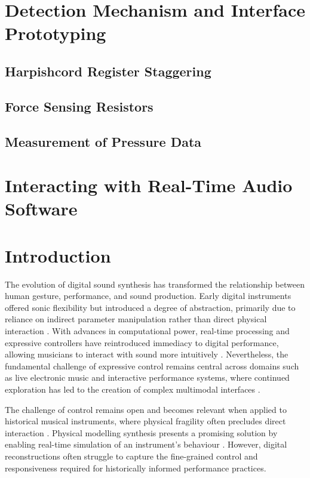 \section{Detection Mechanism and Interface Prototyping}
\subsection{Harpishcord Register Staggering}
\subsection{Force Sensing Resistors}
\subsection{Measurement of Pressure Data}
\section{Interacting with Real-Time Audio Software}


\section{Introduction} 
\label{sec:introduction}
The evolution of digital sound synthesis has transformed the relationship between human gesture, performance, and sound production. Early digital instruments offered sonic flexibility but introduced a degree of abstraction, primarily due to reliance on indirect parameter manipulation rather than direct physical interaction \cite{roads1996computer, moore1990elements}. With advances in computational power, real-time processing and expressive controllers have reintroduced immediacy to digital performance, allowing musicians to interact with sound more intuitively \cite{trolland2022airsticks,caren2020keywi,mcpherson2013space}. Nevertheless, the fundamental challenge of expressive control remains central across domains such as live electronic music and interactive performance systems, where continued exploration has led to the creation of complex multimodal interfaces \cite{tanaka2002multimodal}.

The challenge of control remains open and becomes relevant when applied to historical musical instruments, where physical fragility often precludes direct interaction \cite{mcalpine2014sampling,baldwin2016tromba,nemus2025erc}. Physical modelling synthesis presents a promising solution by enabling real-time simulation of an instrument’s behaviour \cite{smith2010physical, bilbao2009numerical}. However, digital reconstructions often struggle to capture the fine-grained control and responsiveness required for historically informed performance practices.

